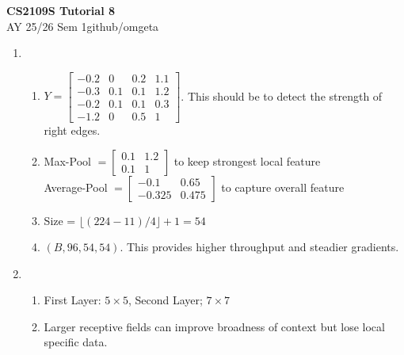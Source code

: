 \documentclass[12pt, a4paper]{article}
\newcommand{\mytitle}{CS2109S Tutorial 8}
\newcommand{\myauthor}{github/omgeta}
\newcommand{\mydate}{AY 25/26 Sem 1}
\begin{document}
\raggedright
\footnotesize
\begin{center}
{\normalsize{\textbf{\mytitle}}} \\
{\footnotesize{\mydate\hspace{2pt}\textemdash\hspace{2pt}\myauthor}}
\end{center}
\begin{enumerate}[\Alph*.]
  \item 
    \begin{enumerate}[\arabic*.]
      \item $Y = \begin{bmatrix}-0.2&0&0.2&1.1\\-0.3&0.1&0.1&1.2\\-0.2&0.1&0.1&0.3\\-1.2&0&0.5&1\end{bmatrix}$. This should be to detect the strength of right edges.

      \item Max-Pool $= \begin{bmatrix}0.1 & 1.2\\ 0.1 & 1\end{bmatrix}$ to keep strongest local feature\\
        Average-Pool $= \begin{bmatrix}-0.1 & 0.65\\ -0.325 & 0.475\end{bmatrix}$ to capture overall feature

      \item Size = $\lfloor (224-11)/4 \rfloor + 1 = 54$

      \item $(B, 96, 54, 54)$. This provides higher throughput and steadier gradients. 
    \end{enumerate}

  \item 
    \begin{enumerate}[\arabic*.]
      \item First Layer: $5\times 5$, Second Layer; $7 \times 7$

      \item Larger receptive fields can improve broadness of context but lose local specific data. 
    \end{enumerate}


\end{enumerate}
\end{document}
